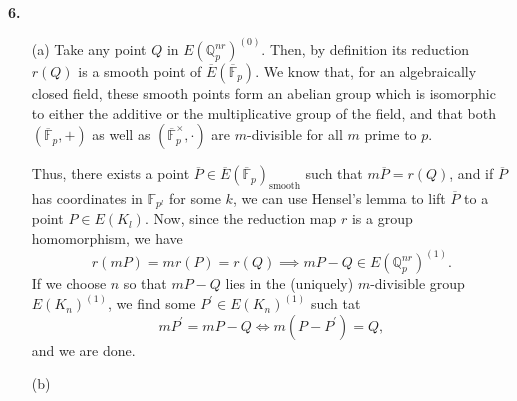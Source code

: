 \documentclass[a4paper]{article}
\newcommand{\Q}{\mathbb{Q}}
\newcommand{\Qp}{\Q_p}
\newcommand{\Fpp}{\overline{\mathbb{F}}_p}
\newcommand{\En}{E(\Qp^{nr})^{(0)}}
\theoremstyle{definition}
\theoremstyle{definition}
\theoremstyle{remark}
\theoremstyle{definition}
\begin{document}
\textbf{6. }
\begin{itemize}
    \item[(a)] Take any point $Q$ in $\En$. Then, by definition its reduction $r(Q)$ is a smooth point of $\overline{E}(\Fpp)$. We know that, for an algebraically closed field, these smooth points form an abelian group which is isomorphic to either the additive or the multiplicative group of the field, and that both $(\Fpp,+)$ as well as $(\Fpp^\times,\cdot)$ are $m$-divisible for all $m$ prime to $p$.

        Thus, there exists a point $\overline{P}\in \overline{E}(\Fpp)_{\text{smooth}}$ such that $m\overline{P}=r(Q)$, and if $\overline{P}$ has coordinates in $\mathbb{F}_{p^l}$ for some $k$, we can use Hensel's lemma to lift $\overline{P}$ to a point $P\in E(K_l)$. Now, since the reduction map $r$ is a group homomorphism, we have
        \[
            r(mP)=m r(P)=r(Q) \implies mP-Q\in E(\Qp^{nr})^{(1)}.
        \]
        If we choose $n$ so that $mP-Q$ lies in the (uniquely) $m$-divisible group $E(K_n)^{(1)}$, we find some $P^\prime\in E(K_n)^{(1)}$ such tat
        \[
            mP^\prime=mP-Q \iff m(P-P^\prime)=Q,
        \]
        and we are done.

    \item[(b)]
\end{itemize}
\end{document}
